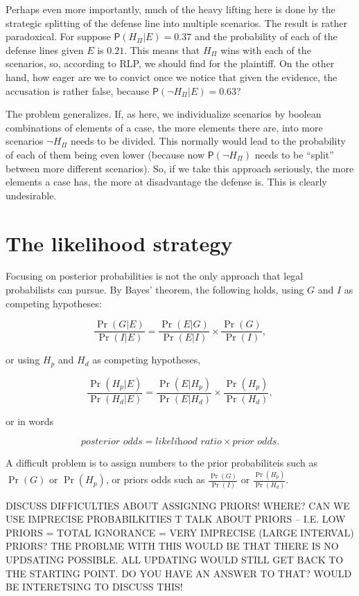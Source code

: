 \documentclass[10pt,dvipsnames,enabledeprecatedfontcommands]{scrartcl}
\newcommand{\n}{\neg}
\newcommand{\pr}[1]{\mathsf{P}(#1)}
\begin{document}
Perhaps even more importantly, much of the heavy lifting here is done by
the strategic splitting of the defense line into multiple scenarios. The
result is rather paradoxical. For suppose \(\pr{H_\Pi\vert E}=0.37\) and
the probability of each of the defense lines given \(E\) is \(0.21\).
This means that \(H_\Pi\) wins with each of the scenarios, so, according
to RLP, we should find for the plaintiff. On the other hand, how eager
are we to convict once we notice that given the evidence, the accusation
is rather false, because \(\pr{\n H_\Pi\vert E}=0.63\)?

The problem generalizes. If, as here, we individualize scenarios by
boolean combinations of elements of a case, the more elements there are,
into more scenarios \(\n H_\Pi\) needs to be divided. This normally
would lead to the probability of each of them being even lower (because
now \(\pr{\n H_\Pi}\) needs to be ``split'' between more different
scenarios). So, if we take this approach seriously, the more elements a
case has, the more at disadvantage the defense is. This is clearly
undesirable.

\hypertarget{the-likelihood-strategy}{%
\section{The likelihood strategy}\label{the-likelihood-strategy}}

Focusing on posterior probabilities is not the only approach that legal
probabilists can pursue. By Bayes' theorem, the following holds, using
\(G\) and \(I\) as competing hypotheses:

\[ \frac{\Pr(G | E)}{\Pr(I | E)} = \frac{\Pr(E | G)}{\Pr(E | I)} \times \frac{\Pr(G)}{\Pr(I)},\]

or using \(H_p\) and \(H_d\) as competing hypotheses,

\[ \frac{\Pr(H_p | E)}{\Pr(H_d | E)} = \frac{\Pr(E | H_p)}{\Pr(E | H_d)} \times \frac{\Pr(H_p)}{\Pr(H_d)},\]

or in words

\[ \textit{posterior odds} = \textit{likelihood ratio} \times \textit{prior odds}.\]

A difficult problem is to assign numbers to the prior probabiliteis such
as \(\Pr(G)\) or \(\Pr(H_p)\), or priors odds such as
\(\frac{\Pr(G)}{\Pr(I)}\) or \(\frac{\Pr(H_p)}{\Pr(H_d)}\).

DISCUSS DIFFICULTIES ABOUT ASSIGNING PRIORS! WHERE? CAN WE USE IMPRECISE
PROBABILKITIES T TALK ABOUT PRIORS -- I.E. LOW PRIORS = TOTAL IGNORANCE
= VERY IMPRECISE (LARGE INTERVAL) PRIORS? THE PROBLME WITH THIS WOULD BE
THAT THERE IS NO UPDSATING POSSIBLE. ALL UPDATING WOULD STILL GET BACK
TO THE STARTING POINT. DO YOU HAVE AN ANSWER TO THAT? WOULD BE
INTERETSING TO DISCUSS THIS!
\end{document}
